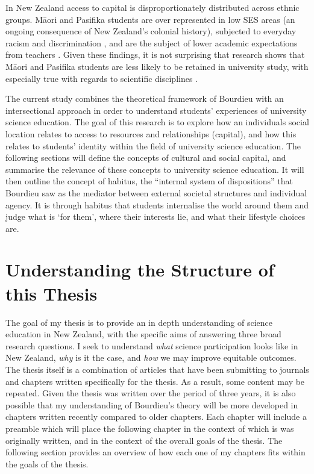 In New Zealand access to capital is disproportionately distributed across ethnic groups. M\={a}ori and Pasifika students are over represented in low SES areas (an ongoing consequence of New Zealand's colonial history), subjected to everyday racism and discrimination \citep{mayeda2014you}, and are the subject of lower academic expectations from teachers \citep{turner2015teacher}. Given these findings, it is not surprising that research shows that M\={a}ori and Pasifika students are less likely to be retained in university study, with especially true with regards to scientific disciplines \cite{EducationCounts_2019}. 

The current study combines the theoretical framework of Bourdieu with an intersectional approach in order to understand students' experiences of university science education. The goal of this research is to explore how an individuals social location relates to access to resources and relationships (capital), and how this relates to students' identity within the field of university science education. The following sections will define the concepts of cultural and social capital, and summarise the relevance of these concepts to university science education. It will then outline the concept of habitus, the ``internal system of dispositions'' that Bourdieu saw as the mediator between external societal structures and individual agency. It is through habitus that students internalise the world around them and judge what is `for them', where their interests lie, and what their lifestyle choices are. 

\section{Understanding the Structure of this Thesis}
The goal of my thesis is to provide an in depth understanding of science education in New Zealand, with the specific aims of answering three broad research questions.  I seek to understand \textit{what} science participation looks like in New Zealand, \textit{why} is it the case, and \textit{how} we may improve equitable outcomes. The thesis itself is a combination of articles that have been submitting to journals and chapters written specifically for the thesis. As a result, some content may be repeated. Given the thesis was written over the period of three years, it is also possible that my understanding of Bourdieu's theory will be more developed in chapters written recently compared to older chapters. Each chapter will include a preamble which will place the following chapter in the context of which is was originally written, and in the context of the overall goals of the thesis. The following section provides an overview of how each one of my chapters fits within the goals of the thesis. 

